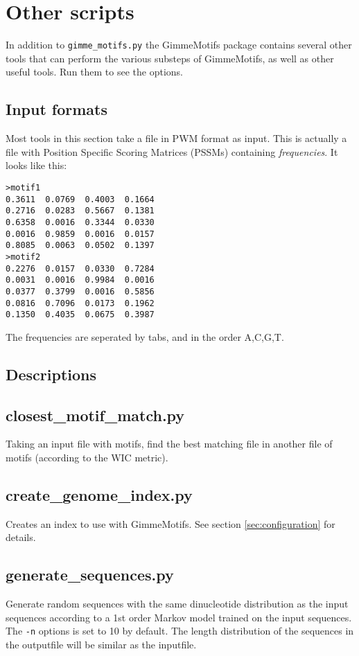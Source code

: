 \documentclass[11pt]{article}
\begin{document}
\section{Other scripts}
In addition to \texttt{gimme\_motifs.py} the GimmeMotifs package contains several other tools that can perform the various substeps of GimmeMotifs, as well as other useful tools. Run them to see the options.

\subsection{Input formats}
Most tools in this section take a file in PWM format as input. This is actually a file with Position Specific Scoring Matrices (PSSMs) containing \emph{frequencies}. It looks like this:
\begin{verbatim}
>motif1
0.3611	0.0769	0.4003	0.1664
0.2716	0.0283	0.5667	0.1381
0.6358	0.0016	0.3344	0.0330
0.0016	0.9859	0.0016	0.0157
0.8085	0.0063	0.0502	0.1397
>motif2
0.2276	0.0157	0.0330	0.7284
0.0031	0.0016	0.9984	0.0016
0.0377	0.3799	0.0016	0.5856
0.0816	0.7096	0.0173	0.1962
0.1350	0.4035	0.0675	0.3987
\end{verbatim}
The frequencies are seperated by tabs, and in the order A,C,G,T.

\subsection{Descriptions}
\subsection*{closest\_motif\_match.py}
Taking an input file with motifs, find the best matching file in another file of motifs (according to the WIC metric).

\subsection*{create\_genome\_index.py}
Creates an index to use with GimmeMotifs. See section \ref{sec:configuration} for details.

\subsection*{generate\_sequences.py}
Generate random sequences with the same dinucleotide distribution as the input sequences according to a 1st order Markov model trained on the input sequences. The \texttt{-n} options is set to 10 by default. The length distribution of the sequences in the outputfile will be similar as the inputfile.
\end{document}
